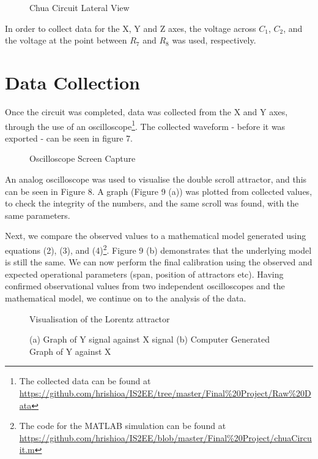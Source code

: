 \documentclass[jou,apacite]{apa6}
\begin{document}
\begin{figure}[H]
\caption{Chua Circuit Lateral View}
\end{figure}

In order to collect data for the X, Y and Z axes, the voltage across $C_1$, $C_2$, and the voltage at the point between $R_7$ and $R_8$ was used, respectively.

\section{Data Collection}

Once the circuit was completed, data was collected from the X and Y axes, through the use of an oscilloscope\footnote{The collected data can be found at \url{https://github.com/hrishioa/IS2EE/tree/master/Final\%20Project/Raw\%20Data}}. The collected waveform - before it was exported - can be seen in figure 7.  

\begin{figure}[H]
\caption{Oscilloscope Screen Capture}
\end{figure}

An analog oscilloscope was used to visualise the double scroll attractor, and this can be seen in Figure 8. A graph (Figure 9 (a)) was plotted from collected values, to check the integrity of the numbers, and the same scroll was found, with the same parameters. 

Next, we compare the observed values to a mathematical model generated using equations (2), (3), and (4)\footnote{The code for the MATLAB simulation can be found at \url{https://github.com/hrishioa/IS2EE/blob/master/Final\%20Project/chuaCircuit.m}}. Figure 9 (b) demonstrates that the underlying model is still the same. We can now perform the final calibration using the observed and expected operational parameters (span, position of attractors etc).
Having confirmed observational values from two independent oscilloscopes and the mathematical model, we continue on to the analysis of the data.

\begin{figure}[H]
\caption{Visualisation of the Lorentz attractor}
\end{figure}

\begin{figure}[H]
\caption{(a) Graph of Y signal against X signal (b) Computer Generated Graph of Y against X}
\endminipage\hfill
{}
\endminipage
\end{figure}
\end{document}
